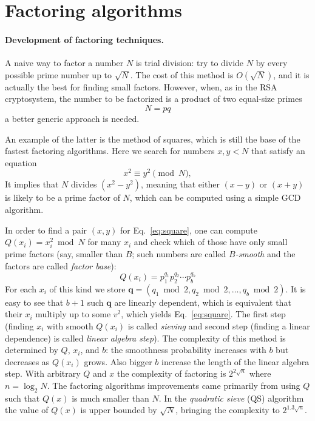 \documentclass[a4paper]{article}
\begin{document}
\section{Factoring algorithms}

\paragraph{Development of factoring techniques.}
A naive way to factor a number $N$ is trial division: try to divide $N$ by every possible prime number up to $\sqrt{N}$. The cost of this method is $O(\sqrt{N})$, and it is actually the best for finding small factors. However, when, as in the RSA cryptosystem, the number to be factorized is a product of two equal-size primes
$$
N = pq
$$
a better generic approach is needed.

An example of the latter is the method of squares, which is still the base of the fastest factoring algorithms. Here we search for numbers $x,y <N$ that satisfy an equation
\begin{equation}\label{eq:square}
x^2 \equiv y^2 \pmod{N},
\end{equation}
It implies that $N$ divides $(x^2-y^2)$, meaning that  either $(x-y)$ or $(x+y)$ is likely to be a prime factor of $N$, which can be computed using a simple GCD algorithm. 

In order to find a pair $(x,y)$ for Eq.~\eqref{eq:square}, one can compute $Q(x_i) = x_i^2\bmod{N}$ for many $x_i$ and check which of those have only small prime factors (say, smaller than $B$; such numbers are called \emph{$B$-smooth} and the factors are called \emph{factor base}): 
$$
Q(x_i) = p_1^{q_1}p_2^{q_2}\cdots p_b^{q_b}
$$For each $x_i$ of this kind we store $\mathbf{q}=(q_1 \bmod 2,q_2 \bmod 2,\ldots,q_b \bmod 2)$. It is easy to see that $b+1$ such $\mathbf{q}$ are linearly dependent, which is equivalent that their $x_i$ multiply up to some $v^2$, which yields Eq.~\eqref{eq:square}. The first step (finding $x_i$ with smooth $Q(x_i)$ is called \emph{sieving} and second step (finding a linear dependence) is called \emph{linear algebra step}).
The complexity of this method is determined by $Q$, $x_i$, and $b$: the smoothness probability increases with $b$ but decreases as $Q(x_i)$ grows. Also bigger $b$ increase the length of the linear algebra step. With arbitrary $Q$ and $x$ the complexity of factoring is $2^{2\sqrt{n}}$ where $n=\log_2 N$.  The factoring algorithms improvements came primarily from using $Q$ such that $Q(x)$ is much smaller than $N$. In the  \emph{quadratic  sieve} (QS) algorithm~\cite{DBLP:conf/eurocrypt/Pomerance84} the value of $Q(x)$ is upper bounded by $\sqrt{N}$, bringing the complexity to $2^{1.3\sqrt{n}}$. 
\end{document}
